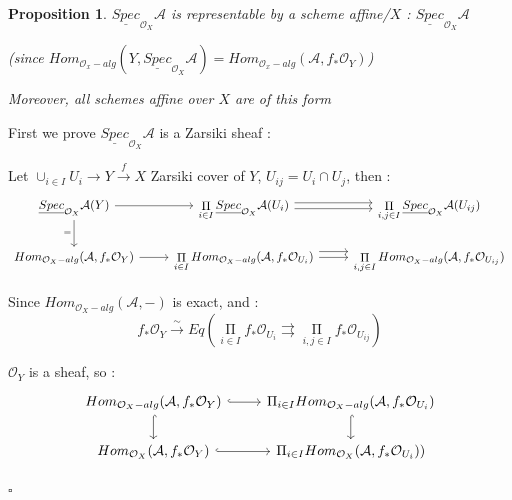 \documentclass{article}
\newtheorem{proposition}[theorem]{Proposition}
\newenvironment{Proof}{{\noindent \indent \it Proof:\quad}}{\hfill $\square$\par}
\begin{document}
\begin{proposition}

$\underline{Spec}_{\mathcal O_X}\mathcal A$ is representable by a  scheme affine/$X$ : $\underline{Spec}_{\mathcal O_X}\mathcal A$

(since $Hom_{\mathcal O_x-alg}(Y,\underline{Spec}_{\mathcal O_X}\mathcal A)
=
Hom_{\mathcal O_x-alg}
(\mathcal A, f_\ast\mathcal O_Y)$)

    Moreover, all schemes affine over $X$ are of this form
\end{proposition}
\begin{Proof}
First we prove $\underline{Spec}_{\mathcal O_X}\mathcal A$ is a Zarsiki sheaf :

Let $\cup_{i\in I}U_i\to Y\xrightarrow{f} X$ Zarsiki cover of $Y$, $U_{ij}=U_i\cap U_j$, then :
\[\begin{tikzcd}
	{\underline{Spec}_{\mathcal O_X}\mathcal A(Y)} & {\mathop{\Pi}\limits_{i\in I}\underline{Spec}_{\mathcal O_X}\mathcal A(U_i)} & {\mathop{\Pi}\limits_{i,j\in I}\underline{Spec}_{\mathcal O_X}\mathcal A(U_{ij})} \\
	{Hom_{\mathcal O_X-alg}(\mathcal A,f_\ast\mathcal O_Y)} & {\mathop{\Pi}\limits_{i\in I}Hom_{\mathcal O_X-alg}(\mathcal A,f_\ast\mathcal O_{U_i})} & {\mathop{\Pi}\limits_{i,j\in I}Hom_{\mathcal O_X-alg}(\mathcal A,f_\ast\mathcal O_{U_{ij}})}
	\arrow[from=1-1, to=1-2]
	\arrow[shift right, from=1-2, to=1-3]
	\arrow[shift left, from=1-2, to=1-3]
	\arrow[from=2-2, to=2-3]
	\arrow[from=2-1, to=2-2]
	\arrow[shift left=2, from=2-2, to=2-3]
	\arrow["{=}"', from=1-1, to=2-1]
\end{tikzcd}\]

Since $Hom_{\mathcal O_X-alg}(\mathcal A,-)$ is exact, and :
$$
f_\ast\mathcal O_Y\xrightarrow{\sim} 
Eq(
\mathop{\Pi}\limits_{i\in I}f_\ast\mathcal O_{U_i}
\rightrightarrows
\mathop{\Pi}\limits_{i,j\in I}f_\ast\mathcal O_{U_{ij}}
)
$$

$\mathcal O_Y$ is a sheaf, so :
\[\begin{tikzcd}
	{Hom_{\mathcal O_X-alg}(\mathcal A, f_\ast\mathcal O_Y)} & {\Pi _{i\in I}Hom_{\mathcal O_X-alg}(\mathcal A, f_\ast\mathcal O_{U_i})} \\
	{Hom_{\mathcal O_X}(\mathcal A, f_\ast\mathcal O_Y)} & {\Pi _{i\in I}Hom_{\mathcal O_X}(\mathcal A, f_\ast\mathcal O_{U_i}))}
	\arrow[hook, from=2-1, to=2-2]
	\arrow[hook, from=1-1, to=2-1]
	\arrow[hook, from=1-1, to=1-2]
	\arrow[hook, from=1-2, to=2-2]
\end{tikzcd}\]


\end{Proof}
\end{document}
